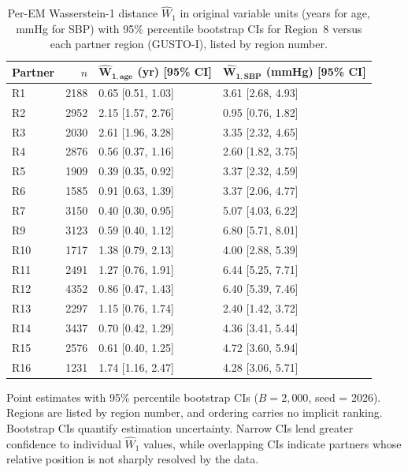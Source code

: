 \documentclass[AMA,Times1COL]{WileyNJDv5}
\begin{document}
\begin{table}[ht]
\centering
\caption{Per-EM Wasserstein-1 distance $\widehat{W}_1$ in original variable units (years for age, mmHg for SBP) with 95\% percentile bootstrap CIs for Region~8 versus each partner region (GUSTO-I), listed by region number.\label{tab:gusto_nabcd}}
\begin{tabular}{lrll}
\toprule
\textbf{Partner} & $n$ & $\boldsymbol{\widehat{W}_{1,\text{age}}}$ \textbf{(yr) [95\% CI]} & $\boldsymbol{\widehat{W}_{1,\text{SBP}}}$ \textbf{(mmHg) [95\% CI]} \\
\midrule
R1  & 2188 & 0.65 [0.51, 1.03] & 3.61 [2.68, 4.93] \\
R2  & 2952 & 2.15 [1.57, 2.76] & 0.95 [0.76, 1.82] \\
R3  & 2030 & 2.61 [1.96, 3.28] & 3.35 [2.32, 4.65] \\
R4  & 2876 & 0.56 [0.37, 1.16] & 2.60 [1.82, 3.75] \\
R5  & 1909 & 0.39 [0.35, 0.92] & 3.37 [2.32, 4.59] \\
R6  & 1585 & 0.91 [0.63, 1.39] & 3.37 [2.06, 4.77] \\
R7  & 3150 & 0.40 [0.30, 0.95] & 5.07 [4.03, 6.22] \\
R9  & 3123 & 0.59 [0.40, 1.12] & 6.80 [5.71, 8.01] \\
R10 & 1717 & 1.38 [0.79, 2.13] & 4.00 [2.88, 5.39] \\
R11 & 2491 & 1.27 [0.76, 1.91] & 6.44 [5.25, 7.71] \\
R12 & 4352 & 0.86 [0.47, 1.43] & 6.40 [5.39, 7.46] \\
R13 & 2297 & 1.15 [0.76, 1.74] & 2.40 [1.42, 3.72] \\
R14 & 3437 & 0.70 [0.42, 1.29] & 4.36 [3.41, 5.44] \\
R15 & 2576 & 0.61 [0.40, 1.25] & 4.72 [3.60, 5.94] \\
R16 & 1231 & 1.74 [1.16, 2.47] & 4.28 [3.06, 5.71] \\
\bottomrule
\end{tabular}
\begin{tablenotes}
\item Point estimates with 95\% percentile bootstrap CIs ($B = 2{,}000$, seed = 2026). Regions are listed by region number, and ordering carries no implicit ranking. Bootstrap CIs quantify estimation uncertainty. Narrow CIs lend greater confidence to individual $\widehat{W}_1$ values, while overlapping CIs indicate partners whose relative position is not sharply resolved by the data.
\end{tablenotes}
\end{table}
\end{document}

